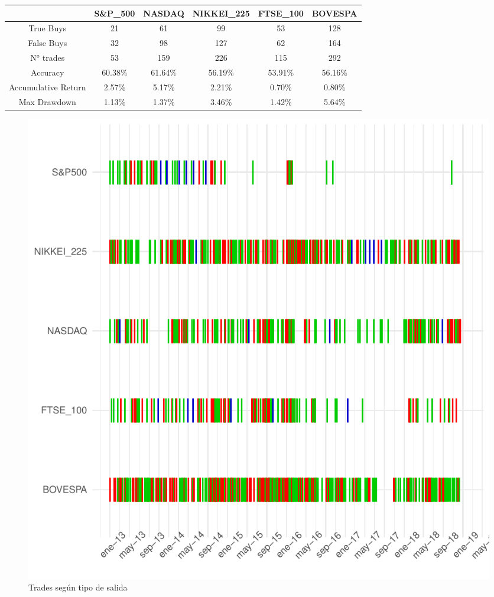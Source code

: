 \documentclass[a4paper,12pt]{Latex/Classes/PhDthesisPSnPDF}
\begin{document}
\begin{center}
\begin{table}[ht]
\centering
\begin{tabular}{cccccc}
  \hline
 & S\&P\_500 & NASDAQ & NIKKEI\_225 & FTSE\_100 & BOVESPA \\ 
  \hline
True Buys & 21 & 61 & 99 & 53 & 128 \\ 
  False Buys & 32 & 98 & 127 & 62 & 164 \\ 
  N° trades & 53 & 159 & 226 & 115 & 292 \\ 
  Accuracy & 60.38\% & 61.64\% & 56.19\% & 53.91\% & 56.16\% \\ 
  Accumulative Return & 2.57\% & 5.17\% & 2.21\% & 0.70\% & 0.80\% \\ 
  Max Drawdown & 1.13\% & 1.37\% & 3.46\% & 1.42\% & 5.64\% \\ 
   \hline
\end{tabular}
\end{table}\end{center}
 
 
 
 
\begin{figure}[H]
\centering
\includegraphics{main-011}
\caption{Trades según tipo de salida}
\end{figure}
\end{document}

